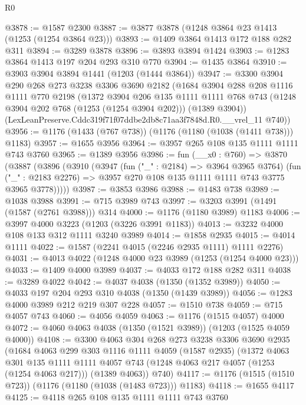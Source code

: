 \begin{lexlean}{R0}
\begin{coremodule}
@3878 := @1587 @2300
@3887 := @3877 @3878 (@1248 @3864 @23 @1413 (@1253 (@1254 @3864 @23)))
@3893 := @1409 @3864 @1413 @172 @188 @282 @311
@3894 := @3289 @3878
@3896 := @3893 @3894 @1424
@3903 := @1283 @3864 @1413 @197 @204 @293 @310 @770
@3904 := @1435 @3864
@3910 := @3903 @3904 @3894 @1441 (@1203 (@1444 @3864))
@3947 := @3300
    @3904
    @290
    @268
    @273
    @3238
    @3306
    @3690
    @2182
    (@1684
      @3904
      @288
      @208
      @1116
      @1111
      @770
      @2198
      (@1372
        @3904
        @206
        @135
        @1111
        @1111
        @768
        @743
        (@1248 @3904 @202 @768 (@1253 (@1254 @3904 @202)))
        (@1389 @3904))
      (LexLeanPreserve.Cddc319f71f07ddbe2db8c71aa3f7848d.R0.__vrel_11 @740))
@3956 := @1176 (@1433 (@767 @738)) (@1176 (@1180 (@1038 (@1411 @738))) @1183)
@3957 := @1655 @3956
@3964 := @3957 @265 @108 @135 @1111 @1111 @743 @3760
@3965 := @1389 @3956
@3986 := fun (__x0 : @760) =>
  @3870
    (@3887
      (@3896
        (@3910
          (@3947
            (fun ("_" : @2184) => @3964 @3965 @3764)
            (fun ("_" : @2183 @2276) => @3957 @270 @108 @135 @1111 @1111 @743 @3775 @3965 @3778)))))
@3987 := @3853 @3986
@3988 := @1483 @738
@3989 := @1038 @3988
@3991 := @715 @3989 @743
@3997 := @3203 @3991 (@1491 (@1587 (@2761 @3988))) @314
@4000 := @1176 (@1180 @3989) @1183
@4006 := @3997 @4000 @3223 (@1203 (@3226 @3991 @1183))
@4013 := @3232 @4000 @108 @133 @312 @1111 @3240 @3989
@4014 := @1858 @2935
@4015 := @4014 @1111
@4022 := @1587 (@2241 @4015 (@2246 @2935 @1111) @1111 @2276)
@4031 := @4013 @4022 (@1248 @4000 @23 @3989 (@1253 (@1254 @4000 @23)))
@4033 := @1409 @4000 @3989
@4037 := @4033 @172 @188 @282 @311
@4038 := @3289 @4022
@4042 := @4037 @4038 (@1350 (@1352 @3989))
@4050 := @4033 @197 @204 @293 @310 @4038 (@1350 (@1439 @3989))
@4056 := @1283 @4000 @3989 @212 @219 @307 @228
@4057 := @1510 @738
@4059 := @715 @4057 @743
@4060 := @4056 @4059
@4063 := @1176 (@1515 @4057) @4000
@4072 := @4060 @4063 @4038 (@1350 (@1521 @3989)) (@1203 (@1525 @4059 @4000))
@4108 := @3300
    @4063
    @304
    @268
    @273
    @3238
    @3306
    @3690
    @2935
    (@1684
      @4063
      @299
      @303
      @1116
      @1111
      @4059
      (@1587 @2935)
      (@1372
        @4063
        @301
        @135
        @1111
        @1111
        @4057
        @743
        (@1248 @4063 @217 @4057 (@1253 (@1254 @4063 @217)))
        (@1389 @4063))
      @740)
@4117 := @1176 (@1515 (@1510 @723)) (@1176 (@1180 (@1038 (@1483 @723))) @1183)
@4118 := @1655 @4117
@4125 := @4118 @265 @108 @135 @1111 @1111 @743 @3760

\end{coremodule}
\end{lexlean}
